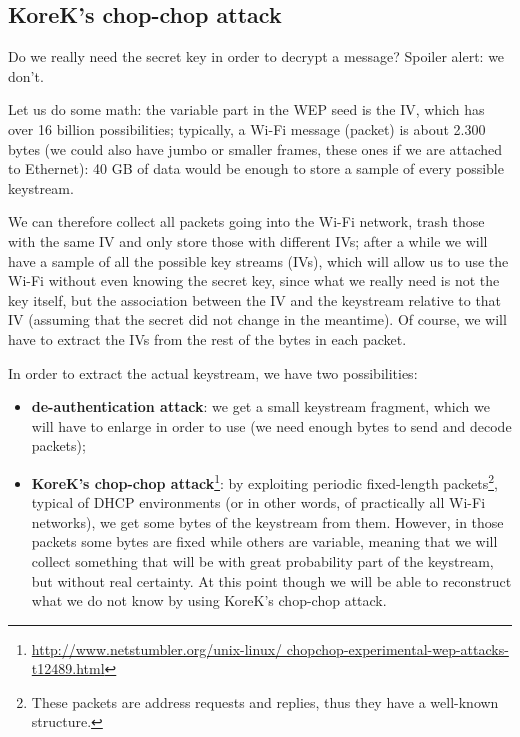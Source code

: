 
\subsection{KoreK's chop-chop attack}
Do we really need the secret key in order to decrypt a message? Spoiler alert: we don't.

Let us do some math: the variable part in the WEP seed is the IV, which has over 16 billion possibilities; typically, a Wi-Fi message (packet) is about 2.300 bytes (we could also have jumbo or smaller frames, these ones if we are attached to Ethernet): 40 GB of data would be enough to store a sample of every possible keystream.

We can therefore collect all packets going into the Wi-Fi network, trash those with the same IV and only store those with different IVs; after a while we will have a sample of all the possible key streams (IVs), which will allow us to use the Wi-Fi without even knowing the secret key, since what we really need is not the key itself, but the association between the IV and the keystream relative to that IV (assuming that the secret did not change in the meantime). Of course, we will have to extract the IVs from the rest of the bytes in each packet.

In order to extract the actual keystream, we have two possibilities:

\begin{itemize}
    \item \textbf{de-authentication attack}: we get a small keystream fragment, which we will have to enlarge in order to use (we need enough bytes to send and decode packets);
    \item \textbf{KoreK’s chop-chop attack}\footnote{\url{http://www.netstumbler.org/unix-linux/
chopchop-experimental-wep-attacks-t12489.html}}: by exploiting periodic fixed-length packets\footnote{These packets are address requests and replies, thus they have a well-known structure.}, typical of DHCP environments (or in other words, of practically all Wi-Fi networks), we get some bytes of the keystream from them. However, in those packets some bytes are fixed while others are variable, meaning that we will collect something that will be with great probability part of the keystream, but without real certainty. At this point though we will be able to reconstruct what we do not know by using KoreK's chop-chop attack.
\end{itemize}

